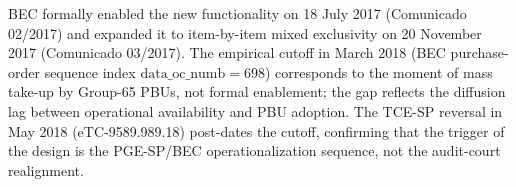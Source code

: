 \begin{table}[!htbp]
\begin{threeparttable}
\begin{tabular}{@{}l l p{0.40\linewidth}@{}}
\bottomrule
\end{tabular}
\begin{tablenotes}\footnotesize
\item[a] BEC formally enabled the new functionality on 18 July 2017 (Comunicado 02/2017) and expanded it to item-by-item mixed exclusivity on 20 November 2017 (Comunicado 03/2017). The empirical cutoff in March 2018 (BEC purchase-order sequence index $\mathrm{data\_oc\_numb} = 698$) corresponds to the moment of mass take-up by Group-65 PBUs, not formal enablement; the gap reflects the diffusion lag between operational availability and PBU adoption. The TCE-SP reversal in May 2018 (eTC-9589.989.18) post-dates the cutoff, confirming that the trigger of the design is the PGE-SP/BEC operationalization sequence, not the audit-court realignment.
\end{tablenotes}
\end{threeparttable}
\end{table}
